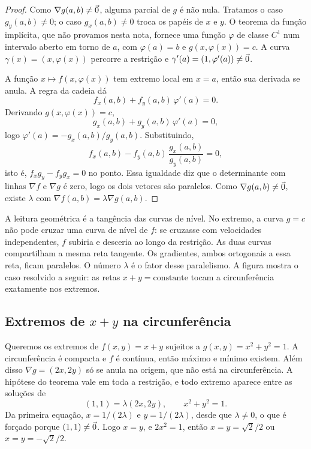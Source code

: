 \documentclass[11pt,a4paper]{article}
\begin{document}
\begin{proof}
Como $\nabla g(a,b)\neq\vec{0}$, alguma parcial de $g$ é não nula. Tratamos o caso $g_y(a,b)\neq 0$; o caso $g_x(a,b)\neq 0$ troca os papéis de $x$ e $y$. O teorema da função implícita, que não provamos nesta nota, fornece uma função $\varphi$ de classe $C^1$ num intervalo aberto em torno de $a$, com $\varphi(a)=b$ e $g(x,\varphi(x))=c$. A curva $\gamma(x)=(x,\varphi(x))$ percorre a restrição e $\gamma'(a)=(1,\varphi'(a))\neq\vec{0}$.

A função $x\mapsto f(x,\varphi(x))$ tem extremo local em $x=a$, então sua derivada se anula. A regra da cadeia dá
\[
f_x(a,b)+f_y(a,b)\,\varphi'(a)=0.
\]
Derivando $g(x,\varphi(x))=c$,
\[
g_x(a,b)+g_y(a,b)\,\varphi'(a)=0,
\]
logo $\varphi'(a)=-g_x(a,b)/g_y(a,b)$. Substituindo,
\[
f_x(a,b)-f_y(a,b)\,\frac{g_x(a,b)}{g_y(a,b)}=0,
\]
isto é, $f_x g_y-f_y g_x=0$ no ponto. Essa igualdade diz que o determinante com linhas $\nabla f$ e $\nabla g$ é zero, logo os dois vetores são paralelos. Como $\nabla g(a,b)\neq\vec{0}$, existe $\lambda$ com $\nabla f(a,b)=\lambda\nabla g(a,b)$.
\end{proof}

A leitura geométrica é a tangência das curvas de nível. No extremo, a curva $g=c$ não pode cruzar uma curva de nível de $f$: se cruzasse com velocidades independentes, $f$ subiria e desceria ao longo da restrição. As duas curvas compartilham a mesma reta tangente. Os gradientes, ambos ortogonais a essa reta, ficam paralelos. O número $\lambda$ é o fator desse paralelismo. A figura mostra o caso resolvido a seguir: as retas $x+y=\mathrm{constante}$ tocam a circunferência exatamente nos extremos.


\subsection{Extremos de $x+y$ na circunferência}

Queremos os extremos de $f(x,y)=x+y$ sujeitos a $g(x,y)=x^2+y^2=1$. A circunferência é compacta e $f$ é contínua, então máximo e mínimo existem. Além disso $\nabla g=(2x,2y)$ só se anula na origem, que não está na circunferência. A hipótese do teorema vale em toda a restrição, e todo extremo aparece entre as soluções de
\[
(1,1)=\lambda(2x,2y),\qquad x^2+y^2=1.
\]
Da primeira equação, $x=1/(2\lambda)$ e $y=1/(2\lambda)$, desde que $\lambda\neq 0$, o que é forçado porque $(1,1)\neq\vec{0}$. Logo $x=y$, e $2x^2=1$, então $x=y=\sqrt{2}/2$ ou $x=y=-\sqrt{2}/2$.
\end{document}

